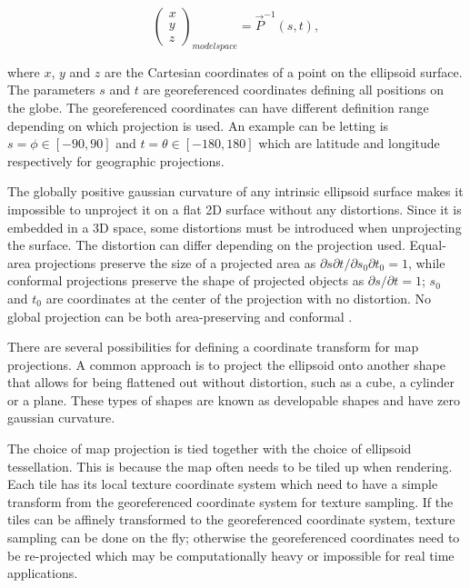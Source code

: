 \begin{equation}
\label{eq:invproj}
\begin{pmatrix} x \\ y \\ z \end{pmatrix}_{ modelspace }=\vec { P }^{-1} (s ,t ),
\end{equation}

where $x$, $y$ and $z$ are the Cartesian coordinates of a point on the ellipsoid surface. The parameters $s$ and $t$ are georeferenced coordinates defining all positions on the globe. The georeferenced coordinates can have different definition range depending on which projection is used. An example can be letting is $s = \phi \in [-90,90]$ and $t = \theta \in [-180,180]$ which are latitude and longitude respectively for geographic projections.

The globally positive gaussian curvature of any intrinsic ellipsoid surface makes it impossible to unproject it on a flat 2D surface without any distortions. Since it is embedded in a 3D space, some distortions must be introduced when unprojecting the surface. The distortion can differ depending on the projection used. Equal-area projections preserve the size of a projected area as $\partial s \partial t / \partial s_0 \partial t_0 = 1$, while conformal projections preserve the shape of projected objects as $\partial s / \partial t = 1$; $s_0$ and $t_0$ are coordinates at the center of the projection with no distortion. No global projection can be both area-preserving and conformal \cite{dimi15}.

There are several possibilities for defining a coordinate transform for map projections. A common approach is to project the ellipsoid onto another shape that allows for being flattened out without distortion, such as a cube, a cylinder or a plane. These types of shapes are known as developable shapes and have zero gaussian curvature.

The choice of map projection is tied together with the choice of ellipsoid tessellation. This is because the map often needs to be tiled up when rendering. Each tile has its local texture coordinate system which need to have a simple transform from the georeferenced coordinate system for texture sampling. If the tiles can be affinely transformed to the georeferenced coordinate system, texture sampling can be done on the fly; otherwise the georeferenced coordinates need to be re-projected which may be computationally heavy or impossible for real time applications.

